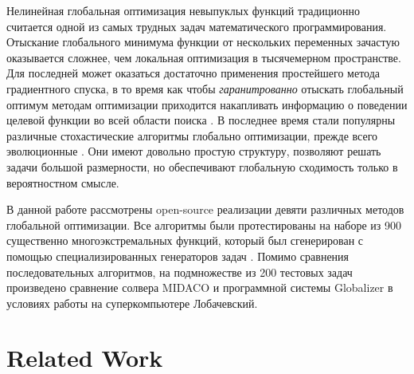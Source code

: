 \documentclass{svproc}
\begin{document}
\begin{Russian}
Нелинейная глобальная оптимизация невыпуклых функций традиционно считается одной из самых трудных
задач математического программирования. Отыскание глобального минимума функции от нескольких переменных
зачастую оказывается сложнее, чем локальная оптимизация в тысячемерном пространстве. Для последней может оказаться достаточно
применения простейшего метода градиентного спуска, в то время как чтобы \textit{гаранитрованно} отыскать глобальный оптимум методам
оптимизации приходится накапливать информацию о поведении целевой функции во всей области поиска \cite{Jones2009,Paulavicius2011,Evtushenko2013,strSergGO}. В последнее время стали популярны
различные стохастические алгоритмы глобально оптимизации, прежде всего эволюционные \cite{Storn1997, SCHLUTER2009, KennedyEberhart1995}. Они имеют довольно простую структуру, позволяют решать задачи большой размерности, но обеспечивают глобальную сходимость только в вероятностном смысле.

В данной работе рассмотрены open-source реализации девяти различных методов глобальной оптимизации.
Все алгоритмы были протестированы на наборе из 900 существенно многоэкстремальных функций, который был сгенерирован с
помощью специализированных генераторов задач \cite{Gaviano2003, grishaginClass}. Помимо сравнения последовательных алгоритмов, на подмножестве из 200 тестовых задач произведено сравнение солвера MIDACO \cite{Schlueter2012} и программной системы Globalizer \cite{globalizerSystem} в условиях работы на суперкомпьютере Лобачевский.
\end{Russian}

\section{Related Work}
\end{document}
